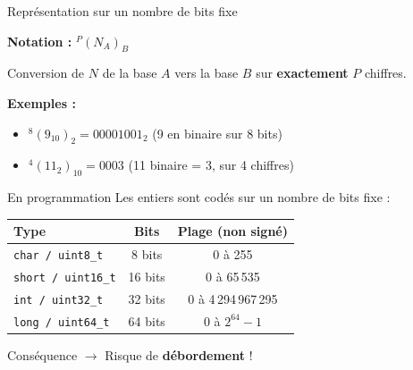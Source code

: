 \documentclass[aspectratio=1610]{beamer}
\begin{document}
\begin{frame}[allowframebreaks]{Représentation sur un nombre de bits fixe}

  \textbf{Notation :} $^P(N_A)_B$

  Conversion de $N$ de la base $A$ vers la base $B$ sur \textbf{exactement} $P$ chiffres.

  \vspace{0.5em}

  \textbf{Exemples :}
  \begin{itemize}
    \item $^8(9_{10})_2 = 00001001_2$ (9 en binaire sur 8 bits)
    \item $^4(11_2)_{10} = 0003$ (11 binaire = 3, sur 4 chiffres)
  \end{itemize}

  \vspace{0.5em}

  \begin{block}{En programmation}
    Les entiers sont codés sur un nombre de bits fixe :

    \begin{center}
      \begin{tabular}{lcc}
        \hline
        \textbf{Type} & \textbf{Bits} & \textbf{Plage (non signé)} \\
        \hline
        \texttt{char / uint8\_t}  & 8 bits  & 0 à 255 \\
        \texttt{short / uint16\_t} & 16 bits & 0 à 65\,535 \\
        \texttt{int / uint32\_t}   & 32 bits & 0 à 4\,294\,967\,295 \\
        \texttt{long / uint64\_t}  & 64 bits & 0 à $2^{64}-1$ \\
        \hline
      \end{tabular}
    \end{center}
  \end{block}

  \vspace{0.5em}

  \pause
  \begin{alertblock}{Conséquence}
    $\rightarrow$ Risque de \textbf{débordement} !
  \end{alertblock}

\end{frame}
\end{document}
